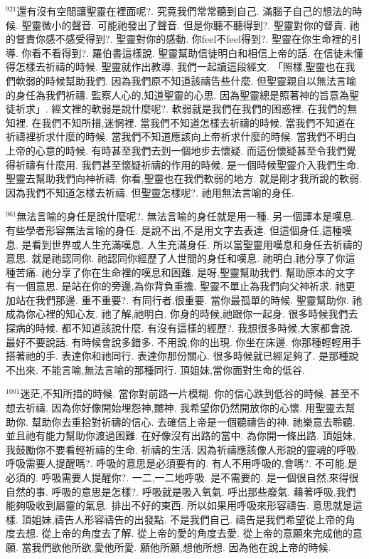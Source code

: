 \documentclass{book}
\begin{document}
$^{921}$還有沒有空間讓聖靈在裡面呢?.
究竟我們常常聽到自己.
滿腦子自己的想法的時候.
聖靈微小的聲音.
可能祂發出了聲音.
但是你聽不聽得到?.
聖靈對你的督責.
祂的督責你感不感受得到?.
聖靈對你的感動.
你feel不feel得到?.
聖靈在你生命裡的引導.
你看不看得到?.
羅伯書這樣說.
聖靈幫助信徒明白和相信上帝的話.
在信徒未懂得怎樣去祈禱的時候.
聖靈就作出教導.
我們一起讀這段經文.
「照樣,聖靈也在我們軟弱的時候幫助我們.
因為我們原不知道該禱告些什麼.
但聖靈親自以無法言喻的身任為我們祈禱.
監察人心的,知道聖靈的心思.
因為聖靈總是照著神的旨意為聖徒祈求」.
經文裡的軟弱是說什麼呢?.
軟弱就是我們在我們的困惑裡.
在我們的無知裡.
在我們不知所措,迷惘裡.
當我們不知道怎樣去祈禱的時候.
當我們不知道在祈禱裡祈求什麼的時候.
當我們不知道應該向上帝祈求什麼的時候.
當我們不明白上帝的心意的時候.
有時甚至我們去到一個地步去懷疑.
而這份懷疑甚至令我們覺得祈禱有什麼用.
我們甚至懷疑祈禱的作用的時候.
是一個時候聖靈介入我們生命.
聖靈去幫助我們向神祈禱.
你看,聖靈也在我們軟弱的地方.
就是剛才我所說的軟弱.
因為我們不知道怎樣去祈禱.
但聖靈怎樣呢?.
祂用無法言喻的身任.

$^{961}$無法言喻的身任是說什麼呢?.
無法言喻的身任就是用一種.
另一個譯本是嘆息.
有些學者形容無法言喻的身任.
是說不出,不是用文字去表達.
但這個身任,這種嘆息.
是看到世界或人生充滿嘆息.
人生充滿身任.
所以當聖靈用嘆息和身任去祈禱的意思.
就是祂認同你.
祂認同你經歷了人世間的身任和嘆息.
祂明白,祂分享了你這種苦痛.
祂分享了你在生命裡的嘆息和困難.
是呀,聖靈幫助我們.
幫助原本的文字有一個意思.
是站在你的旁邊,為你背負重擔.
聖靈不單止為我們向父神祈求.
祂更加站在我們那邊.
重不重要?.
有同行者,很重要.
當你最孤單的時候.
聖靈幫助你.
祂成為你心裡的知心友.
祂了解,祂明白.
你身的時候,祂跟你一起身.
很多時候我們去探病的時候.
都不知道該說什麼.
有沒有這樣的經歷?.
我想很多時候,大家都會說.
最好不要說話.
有時候會說多錯多.
不用說,你的出現.
你坐在床邊.
你那種輕輕用手搭著祂的手.
表達你和祂同行.
表達你那份關心.
很多時候就已經足夠了.
是那種說不出來.
不能言喻,無法言喻的那種同行.
頂姐妹,當你面對生命的低谷.

$^{1001}$迷茫,不知所措的時候.
當你對前路一片模糊.
你的信心跌到低谷的時候.
甚至不想去祈禱.
因為你好像開始埋怨神,嬲神.
我希望你仍然開放你的心懷.
用聖靈去幫助你.
幫助你去重拾對祈禱的信心.
去確信上帝是一個聽禱告的神.
祂樂意去聆聽.
並且祂有能力幫助你渡過困難.
在好像沒有出路的當中.
為你開一條出路.
頂姐妹,我鼓勵你不要看輕祈禱的生命.
祈禱的生活.
因為祈禱應該像人形說的靈魂的呼吸.
呼吸需要人提醒嗎?.
呼吸的意思是必須要有的.
有人不用呼吸的,會嗎?.
不可能,是必須的.
呼吸需要人提醒你?.
一二,一二地呼吸.
是不需要的.
是一個很自然,來得很自然的事.
呼吸的意思是怎樣?.
呼吸就是吸入氧氣.
呼出那些廢氣.
藉著呼吸,我們能夠吸收到屬靈的氣息.
排出不好的東西.
所以如果用呼吸來形容禱告.
意思就是這樣.
頂姐妹,禱告人形容禱告的出發點.
不是我們自己.
禱告是我們希望從上帝的角度去想.
從上帝的角度去了解.
從上帝的愛的角度去愛.
從上帝的意願來完成他的意願.
當我們欲他所欲,愛他所愛.
願他所願,想他所想.
因為他在說上帝的時候.
\end{document}
